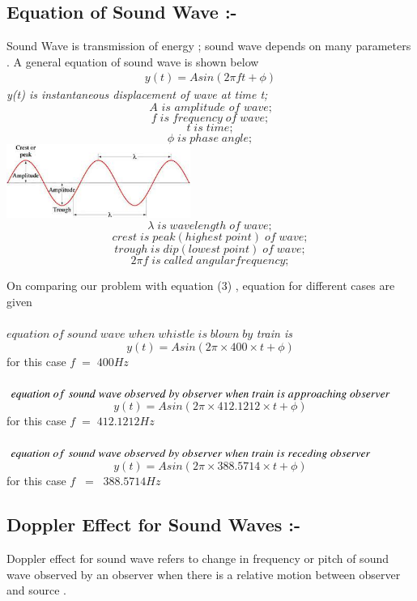 \documentclass[journal,12pt,twocolumn]{IEEEtran}
\theoremstyle{remark}
\begin{document}
\subsection*{\textbf{Equation of Sound Wave :-}}
Sound Wave is transmission of energy ; sound wave depends on many parameters . A general equation of sound wave is shown below 
\begin{align}y(t) = Asin( 2 \pi ft + \phi ) \end{align} 
\textit{y(t) is instantaneous 
displacement of wave at time t;}$$\textit{A is amplitude of wave;}$$$$f\;is\; frequency\; of\; wave;$$
$$t \;is\; time;$$$$\phi \; is \; phase \; angle;$$
\includegraphics[width=0.45\textwidth]{figs/waves.jpeg}\\
$$\lambda \;is\; wavelength\; of\; wave;$$$$crest \;is\; peak(highest\; point) \;of\; wave;$$$$trough\; is\; dip(lowest\; point) \;of\; wave;$$
$$2\pi f \;is \; called\; angular frequency;$$

On comparing our problem with equation (3) , equation for different cases are given\\\\
$equation \;of\; sound\; wave\; when\; whistle\; is\; blown\; by$
\textit{train is}
$$y(t) = Asin( 2 \pi \times400\times t + \phi ) $$ 
\;\;\;\;\;\;\;\;\;\;\;\;\;\;\;\;\;\;\;\;for this case $f\;=\;400Hz$\\\\
$equation \;of\; sound\; wave\; observed\; by\; observer\;when\\ \;train\;is\; approaching\; observer\;$
$$y(t) = Asin( 2 \pi \times412.1212\times t + \phi ) $$ 
\;\;\;\;\;\;\;\;\;\;\;\;\;\;\;\;\;\;\;\;for this case $f\;=\;412.1212Hz$\\\\
$equation \;of\; sound\; wave\; observed\; by\; observer\;when\\ \;train\;is\; receding\; observer\;$
$$y(t) = Asin( 2 \pi \times388.5714\times t + \phi ) $$ 
\;\;\;\;\;\;\;\;\;\;\;\;\;\;\;\;\;\;\;\;for this case $f \;\;= \;\;388.5714Hz$\\
\subsection*{\textbf{Doppler Effect for Sound Waves :-}}
Doppler effect for sound wave refers to change in frequency or pitch of sound wave observed by an observer when there is a relative motion between observer and source .\\\\
\end{document}
